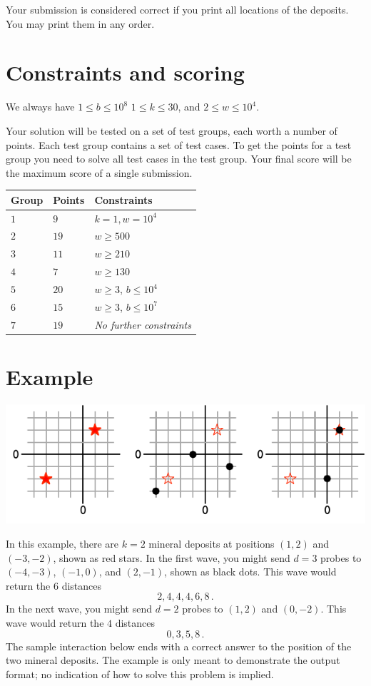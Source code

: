 Your submission is considered correct if you print all locations of the deposits.
You may print them in any order.

\section*{Constraints and scoring}

We always have 
$1\leq b \leq 10^8$ %
$1 \leq k \leq 30$, %
and
$2 \le w \le 10^4$. %

Your solution will be tested on a set of test groups, each worth a number of points.
Each test group contains a set of test cases.
To get the points for a test group you need to solve all test cases in the test group.
Your final score will be the maximum score of a single submission.

\medskip
\begin{tabular}{lll}
Group & Points & Constraints \\\hline
  $1$ & $9$ & $k = 1, w = 10^4$\\
  $2$ & $19$ & $w \ge 500$\\
  $3$ & $11$ & $w \ge 210$\\
  $4$ & $7$ & $w \ge 130$\\
  $5$ & $20$ & $w \ge 3$, $b \le 10^4$\\
  $6$ & $15$ & $w \ge 3$, $b \le 10^7$\\
  $7$ & $19$ & \emph{No further constraints}
\end{tabular}

\section*{Example}

\includegraphics[width=.6\textwidth]{img/sample1.pdf}

In this example, there are $k=2$ mineral deposits at positions $(1,2)$ and $(-3,-2)$, shown as red stars.
In the first wave, you might send $d=3$ probes to $(-4,-3)$, $(-1, 0)$, and $(2,-1)$, shown as black dots.
This wave would return the $6$ distances \[
  2, 4, 4, 4, 6, 8\,.
\]
In the next wave, you might send $d=2$ probes to $(1,2)$ and $(0,-2)$.
This wave would return the $4$ distances \[
  0, 3, 5, 8\,.
\]
The sample interaction below ends with a correct answer to the position of the two mineral deposits.
The example is only meant to demonstrate the output format; no indication of how to solve this problem is implied.
